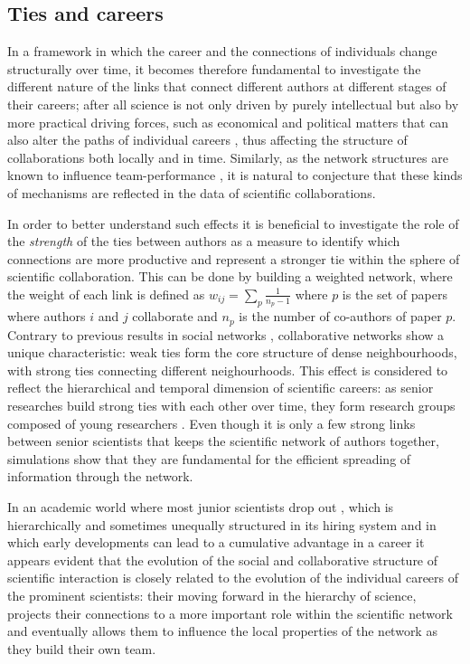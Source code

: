  
 \subsection{Ties and careers}
 In a framework in which the career and the connections of individuals change structurally over time, it becomes therefore fundamental to investigate the different nature of the links that connect different authors at different stages of their careers; after all science is not only
 driven by purely intellectual but also by more practical driving forces, such as economical and political matters that can also alter the paths of individual careers \cite{Kaplan2010,Petersen2012}, thus affecting
 the structure of collaborations both locally and in time. Similarly, as the network structures are known to influence team-performance \cite{Guimera2005,PentlandTeam}, it is natural to conjecture that these kinds of mechanisms are 
 reflected in the data of scientific collaborations. 
 
 In order to better understand such effects it is beneficial to investigate the role of the \textit{strength} of the ties between authors as a measure to identify which
 connections are more productive and represent a stronger tie within the sphere of scientific collaboration. This can be done by building a weighted network, where the weight of each link is defined as $w_{ij} =  \sum_{p} \frac{1}{n_{p} -1 }$
 where $p$ is the set of papers where authors $i$ and $j$ collaborate and  $ n_{p}$  is the number of co-authors of paper $p$.  
 Contrary to previous results in social networks \cite{Onnela01052007}, 
 collaborative networks show a unique characteristic: weak ties form the core structure of 
 dense neighbourhoods, with strong ties connecting different neighourhoods. This effect is considered
 to reflect the hierarchical and temporal dimension of scientific careers: as senior researches build strong ties with each
 other over time, they form research groups composed of young researchers \cite{Pan2012Ties,Ke2014}. Even though it is only
 a few strong links between senior scientists that keeps the scientific network of authors together, simulations show that 
 they are fundamental for the efficient spreading of information through the network. 
 
 In an academic world where
 most junior scientists drop out \cite{Pan2012Ties}, which is hierarchically and sometimes unequally structured in its hiring
 system \cite{Clausete1400005} and in which early developments can lead to a cumulative advantage in a career  \cite{MatthewEffect,Petersen04012011}
  it appears evident that the evolution of the social and collaborative structure of scientific interaction is closely related to 
 the evolution of the individual careers of the prominent scientists: their moving forward in the 
 hierarchy of science, projects their connections to a more important role within the scientific network and eventually allows them
 to influence the local properties of the network as they build their own team. 
 
